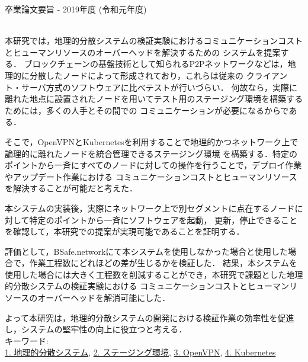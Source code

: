 卒業論文要旨 - 2019年度 (令和元年度)
\begin{center}
\begin{large}
\end{large}
\end{center}

~ \\
本研究では，地理的分散システムの検証実験におけるコミュニケーションコストとヒューマンリソースのオーバーヘッドを解決するための
システムを提案する．
ブロックチェーンの基盤技術として知られるP2Pネットワークなどは，地理的に分散したノードによって形成されており，これらは従来の
クライアント・サーバ方式のソフトウェアに比べテストが行いづらい．
何故なら，実際に離れた地点に設置されたノードを用いてテスト用のステージング環境を構築するためには，多くの人手とその間での
コミュニケーションが必要になるからである．

そこで，OpenVPNとKubernetesを利用することで地理的かつネットワーク上で論理的に離れたノードを統合管理できるステージング環境
を構築する．特定のポイントから一斉にすべてのノードに対しての操作を行うことで，デプロイ作業やアップデート作業における
コミュニケーションコストとヒューマンリソースを解決することが可能だと考えた．

本システムの実装後，実際にネットワーク上で別セグメントに点在するノードに対して特定のポイントから一斉にソフトウェアを起動，
更新，停止できることを確認して，本研究での提案が実現可能であることを証明する．

評価として，BSafe.networkにて本システムを使用しなかった場合と使用した場合で，作業工程数にどれほどの差が生じるかを検証した．
結果，本システムを使用した場合には大きく工程数を削減することができ，本研究で課題とした地理的分散システムの検証実験における
コミュニケーションコストとヒューマンリソースのオーバーヘッドを解消可能にした．

よって本研究は，地理的分散システムの開発における検証作業の効率性を促進し，システムの堅牢性の向上に役立つと考える．
~ \\
キーワード:\\
\underline{1. 地理的分散システム},
\underline{2. ステージング環境},
\underline{3. OpenVPN},
\underline{4. Kubernetes}
\begin{flushright}
\dept \\
\author
\end{flushright}
